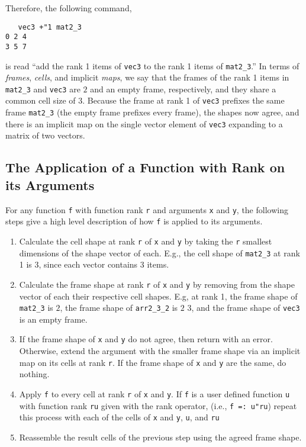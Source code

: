 Therefore, the following command, 

\begin{singlespacing}
\begin{small}
\begin{verbatim}
   vec3 +"1 mat2_3
0 2 4
3 5 7
\end{verbatim}
\end{small}
\end{singlespacing}

is read ``add the rank 1 items of \texttt{vec3} to the rank 1 items of \texttt{mat2\_3}.''
In terms of \textit{frames}, \textit{cells}, and implicit \textit{maps}, we say that
the frames of the rank 1 items in \texttt{mat2\_3} and \texttt{vec3} are $2$ and an empty frame, respectively, and they share a common cell size of $3$.
Because the frame at rank 1 of \texttt{vec3} prefixes the same frame \texttt{mat2\_3} (the empty frame prefixes every frame), 
the shapes now agree, and there is an implicit map on the single vector element of \texttt{vec3} expanding to a matrix of two vectors.

\subsection{The Application of a Function with Rank on its Arguments}
\label{fridp}
For any function \texttt{f} with function rank \texttt{r} and arguments \texttt{x} and \texttt{y}, 
the following steps give a high level description of how \texttt{f} is applied to its arguments.\cite{rankanduni}
\begin{enumerate}
	\item Calculate the cell shape at rank \texttt{r} of \texttt{x} and \texttt{y} 
		by taking the \texttt{r} smallest dimensions of the shape vector of each.
		E.g., the cell shape of \texttt{mat2\_3} at rank 1 is 3, since each vector contains 3 items.
	\item Calculate the frame shape at rank \texttt{r} of \texttt{x} and \texttt{y} 
		by removing from the shape vector of each their respective cell shapes.
		E.g, at rank 1, the frame shape of \texttt{mat2\_3} is $2$,
		the frame shape of \texttt{arr2\_3\_2} is $2$ $3$, 
		and the frame shape of \texttt{vec3} is an empty frame.
	\item If the frame shape of \texttt{x} and \texttt{y} do not agree, then return with an error.
		Otherwise, extend the argument with the smaller frame shape via an implicit map on its cells at rank \texttt{r}.
		If the frame shape of \texttt{x} and \texttt{y} are the same, do nothing.
	\item \label{dataparstep}Apply \texttt{f} to every cell at rank \texttt{r} of \texttt{x} and \texttt{y}.
		If \texttt{f} is a user defined function \texttt{u} with function rank \texttt{ru} given with the rank operator,
		(i.e., \texttt{f =: u"ru})
		repeat this process with each of the cells of \texttt{x} and \texttt{y}, \texttt{u}, and \texttt{ru}
	\item Reassemble the result cells of the previous step using the agreed frame shape.
\end{enumerate}

